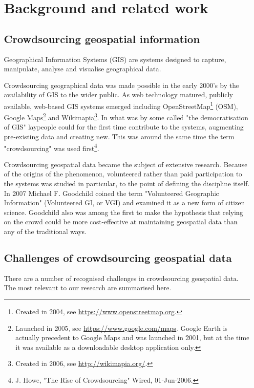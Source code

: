 \section{Background and related work}

\subsection{Crowdsourcing geospatial information}

Geographical Information Systems (GIS) are systems designed to capture, manipulate, analyse and visualise geographical data. 

Crowdsourcing geographical data was made possible in the early 2000's by the availability of GIS to the wider public. As web technology matured, publicly available, web-based GIS systems emerged including OpenStreetMap\footnote{Created in 2004, see \url{https://www.openstreetmap.org}.} (OSM), Google Maps\footnote{Launched in 2005, see \url{https://www.google.com/maps}. Google Earth is actually precedent to Google Maps and was launched in 2001, but at the time it was available as a downloadable desktop application only.} and Wikimapia\footnote{Created in 2006, see \url{http://wikimapia.org/}.}. In what was by some called "the democratisation of GIS" \cite{Butler:2006fe} laypeople could for the first time contribute to the systems, augmenting pre-existing data and creating new. This was around the same time the term "crowdsourcing" was used first\footnote{J. Howe, "The Rise of Crowdsourcing" Wired, 01-Jun-2006.}.

Crowdsourcing geospatial data became the subject of extensive research. Because of the origins of the phenomenon, volunteered rather than paid participation to the systems was studied in particular, to the point of defining the discipline itself. In 2007 Michael F. Goodchild coined the term "Volunteered Geographic Information" (Volunteered GI, or VGI) \cite{Goodchild:2007vt} and examined it as a new form of citizen science. Goodchild also was among the first to make the hypothesis that relying on the crowd could be more cost-effective at maintaining geospatial data than any of the traditional ways.

\subsection{Challenges of crowdsourcing geospatial data}
\label{challenges-of-crowdsourcing-geospatial-data}

There are a number of recognised challenges in crowdsourcing geospatial data. The most relevant to our research are summarised here.

